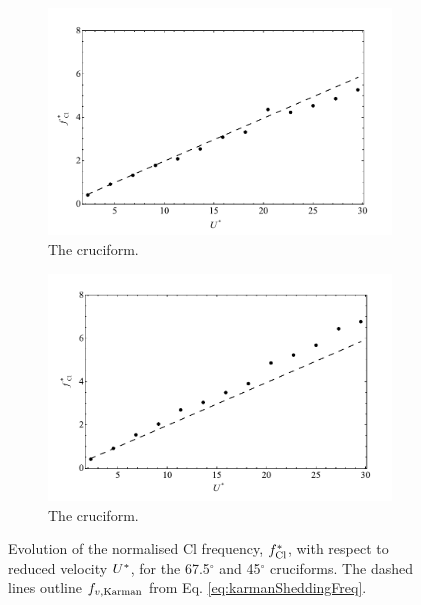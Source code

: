 \documentclass[oneside]{utmthesis}
\begin{document}
\begin{figure}
  \centering
  \begin{subfigure}[h]{1\textwidth}
    \includegraphics[width=\textwidth]{figs/clFreq4}
    \caption{The \angfo{} cruciform.}
    \label{fig:clFreq4}
  \end{subfigure}
 
  \begin{subfigure}[h]{1\textwidth}
    \includegraphics[width=\textwidth]{figs/clFreq3}
    \caption{The \angth{} cruciform.}
    \label{fig:clFreq3}
  \end{subfigure}

  \label{fig:clFreq43}
  \caption{Evolution of the normalised Cl frequency, $f_{\text{Cl}}^{*}$, with respect to reduced velocity $U^{*}$, for the 67.5$^{\circ}$ and 45$^{\circ}$ cruciforms. The dashed lines outline $f_{v,\text{Karman}}$ from Eq. \ref{eq:karmanSheddingFreq}.}
\end{figure}
\end{document}
